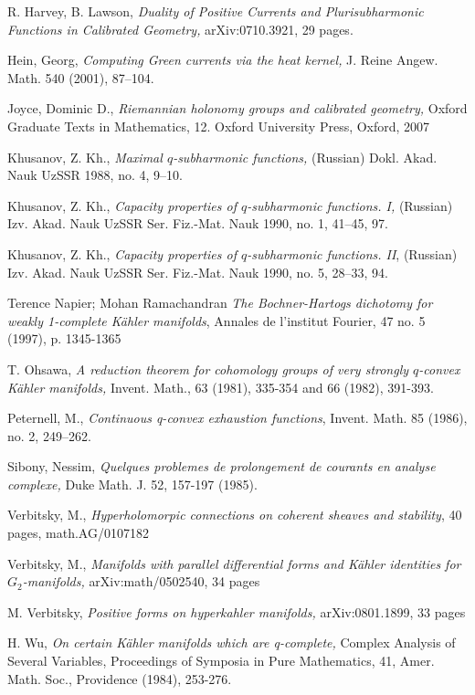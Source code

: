 \documentclass[11pt]{article}
\numberwithin{equation}{section}
\newcommand{\6}{\partial}
\newcounter{theorem}[section]
\newcounter{problem}[section]
\begin{document}
{\begin{thebibliography}{GMP}
R. Harvey, B. Lawson, 
{\em  Duality of Positive Currents and 
Plurisubharmonic Functions in Calibrated Geometry,} arXiv:0710.3921,
29 pages.

Hein, Georg,
{\em Computing Green currents via the heat kernel,}
J. Reine Angew. Math. 540 (2001), 87--104.

Joyce, Dominic D., {\em Riemannian holonomy groups and calibrated geometry,}
Oxford Graduate Texts in Mathematics, 12. Oxford University Press, 
Oxford, 2007

Khusanov, Z. Kh., {\em Maximal $q$-subharmonic functions,} (Russian) 
   Dokl. Akad. Nauk UzSSR 1988, no. 4, 9--10.

 Khusanov, Z. Kh., {\em Capacity properties of $q$-subharmonic
   functions. I,} (Russian) 
Izv. Akad. Nauk UzSSR Ser. Fiz.-Mat. Nauk 1990, no. 1,
 41--45, 97.

Khusanov, Z. Kh., {\em Capacity properties of $q$-subharmonic
   functions. II},  (Russian)  Izv. Akad. Nauk UzSSR Ser. 
Fiz.-Mat. Nauk 1990, no. 5, 28--33, 94.

 Terence Napier;  Mohan Ramachandran
{\em The Bochner-Hartogs dichotomy for weakly 1-complete K\"ahler manifolds},
Annales de l'institut Fourier, 47 no. 5 (1997), p. 1345-1365
    


T. Ohsawa,
{\em A reduction theorem for cohomology groups of very
  strongly  $q$-convex K\"ahler manifolds,}
Invent. Math., 63 (1981), 335-354 and 66 (1982), 391-393.
 

Peternell, M.,
{\em Continuous q-convex exhaustion functions},
 Invent. Math.  85  (1986),  no. 2, 249--262. 

Sibony, Nessim,
{\em Quelques problemes de prolongement de courants en analyse complexe,}
Duke Math. J. 52, 157-197 (1985).


Verbitsky, M.,
{\em Hyperholomorpic connections   on coherent  sheaves 
and stability}, 40 pages, math.AG/0107182


Verbitsky, M.,
{\em Manifolds with parallel differential forms and K\"ahler
identities for $G_2$-manifolds, }
arXiv:math/0502540, 34 pages

M. Verbitsky,
{\em Positive forms on hyperkahler manifolds,}
 arXiv:0801.1899, 33 pages

H. Wu, {\em On certain K\"ahler manifolds which are q-complete,}
Complex Analysis of Several Variables, Proceedings of
Symposia in Pure Mathematics, 41, Amer. Math. Soc.,
Providence (1984), 253-276.



\end{thebibliography}
}
\end{document}
